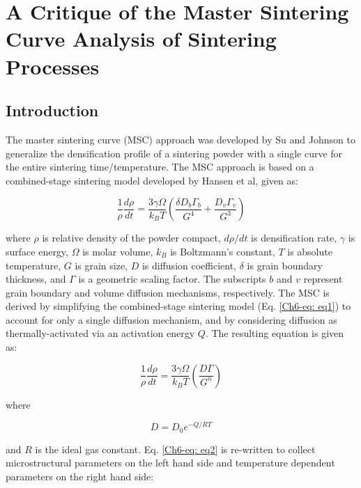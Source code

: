 \chapter{A Critique of the Master Sintering Curve Analysis of Sintering Processes}

\section{Introduction}
The master sintering curve (MSC) approach was developed by Su and Johnson \cite{Su1996} to generalize the densification profile of a sintering powder with a single curve for the entire sintering time/temperature. The MSC approach is based on a combined-stage sintering model developed by Hansen et al, \cite{Hansen1992} given as:

\begin{equation}
\label{Ch6-eq: eq1}
\frac{1}{\rho} \frac{d\rho}{dt} = \frac{3 \gamma \Omega}{k_{B}T} \left( \frac{\delta D_{b} \Gamma_{b}}{G^{4}} + \frac{D_{v} \Gamma_{v}}{G^{3}} \right)
\end{equation}

\noindent where $\rho$ is relative density of the powder compact, $d\rho/dt$ is densification rate, $\gamma$ is surface energy, $\Omega$ is molar volume, $k_{B}$ is Boltzmann’s constant, $T$ is absolute temperature, $G$ is grain size, $D$ is diffusion coefficient, $\delta$ is grain boundary thickness, and $\Gamma$ is a geometric scaling factor. The subscripts $b$ and $v$ represent grain boundary and volume diffusion mechanisms, respectively. The MSC is derived by simplifying the combined-stage sintering model (Eq. \ref{Ch6-eq: eq1}) to account for only a single diffusion mechanism, and by considering diffusion as thermally-activated via an activation energy $Q$. The resulting equation is given as:

\begin{equation}
\label{Ch6-eq: eq2}
\frac{1}{\rho} \frac{d\rho}{dt} = \frac{3 \gamma \Omega}{k_{B}T} \left( \frac{D \Gamma}{G^{n}} \right)
\end{equation}

\noindent where

\begin{equation}
\label{Ch6-eq: eq3}
D = D_{0}e^{-Q/RT}
\end{equation}

\noindent and $R$ is the ideal gas constant. Eq. \ref{Ch6-eq: eq2} is re-written to collect microstructural parameters on the left hand side and temperature dependent parameters on the right hand side:

